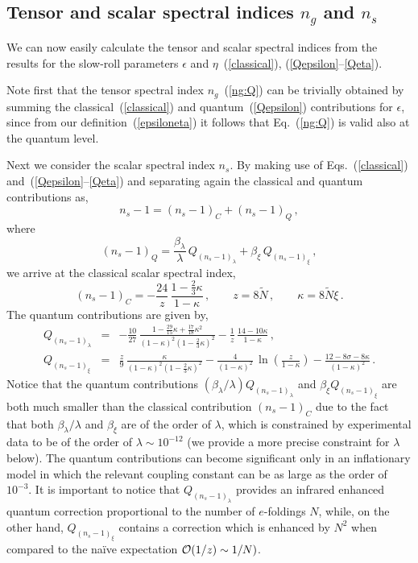 \documentclass[aps,12pt,superscriptaddress,preprintnumbers,
                secnumarabic,nofootinbib,showpacs]{revtex4}
\begin{document}
\subsection{Tensor and scalar spectral indices $n_g$ and $n_s$}
\label{Tensor and scalar spectral indices $n_g$ and $n_s$}

 We can now easily calculate the tensor and scalar spectral indices from
the results for the slow-roll parameters
 $\epsilon$ and $\eta$~(\ref{classical}), (\ref{Qepsilon}--\ref{Qeta}).

 Note first that the tensor spectral index $n_g$~(\ref{ng:Q})
can be trivially obtained by summing the classical~(\ref{classical})
and quantum~(\ref{Qepsilon}) contributions for $\epsilon$, since from our
definition~(\ref{epsiloneta}) it follows that Eq.~(\ref{ng:Q})
is valid also at the quantum level.

 Next we consider the scalar spectral index $n_s$.
By making use of Eqs.~(\ref{classical}) and~(\ref{Qepsilon}--\ref{Qeta}) and
separating again the classical and quantum contributions as,
\begin{equation}
n_s -1 = (n_s-1)_{C} + (n_s-1)_Q
\,,
\label{nsQ}
\end{equation}
where
\begin{equation}
(n_s-1)_Q = \frac{\beta_{\lambda}}{\lambda}\,Q_{(n_s-1)_{\lambda}}
+ \beta_{\xi}\,Q_{(n_s-1)_{\xi}}\,,
\end{equation}
we arrive at the classical scalar spectral index,
\begin{equation}
(n_s-1)_{C} =
-\frac{24}{z}\,\frac{1-\frac23\kappa}{1-\kappa}
\,,\qquad
  z = 8\tilde N\,,\qquad \kappa = 8\tilde N\xi
\,.
\label{nsC}
\end{equation}
The quantum contributions are given by,
\begin{eqnarray}
Q_{(n_s-1)_{\lambda}} &=&
 -\frac{10}{27}\,
\frac{1-\frac{29}{15}\kappa+\frac{17}{18}\kappa^2}{(1-\kappa)^2(1-\frac{2}{3}\kappa)^2}
-\frac{1}{z}\,\frac{14-10\kappa}{1-\kappa}
\,,
\label{nsQ2}
\\
Q_{(n_s-1)_{\xi}} &=&
\frac{z}{9}\,\frac{\kappa}{(1-\kappa)^2(1-\frac{2}{3}\kappa)^2} - \frac{4}{(1-\kappa)^2}\,\ln\left(\frac{z}{1-\kappa}\right) - \frac{12-8\sigma-8\kappa}{(1-\kappa)^2} \,.
\nonumber
\end{eqnarray}
Notice that the quantum contributions
$({\beta_{\lambda}}/{\lambda})Q_{(n_s-1)_{\lambda}}$ and
$\beta_{\xi}Q_{(n_s-1)_{\xi}}$ are both much smaller than the
classical contribution $(n_s-1)_C$ due to the fact that both
${\beta_{\lambda}}/{\lambda}$ and $\beta_{\xi}$ are of the order of
$\lambda$, which is constrained by experimental data to be of the
order of $\lambda \sim 10^{-12}$ (we provide a more precise
constraint for $\lambda$ below). The quantum contributions can
become significant only in an inflationary model in which the
relevant coupling constant can be as large as the order of $10^{-3}$.
It is important to notice that $Q_{(n_s-1)_{\lambda}}$ provides an
infrared enhanced quantum correction proportional to the number of
$e$-foldings $N$, while, on the other hand, $Q_{(n_s-1)_{\xi}}$
contains a correction which is enhanced by $N^2$ when compared to
the na\"ive expectation ${\cal O}(1/z)\sim 1/N)$. 
\end{document}
